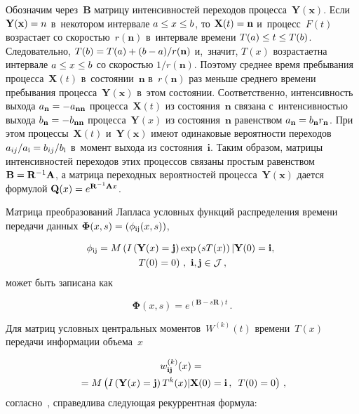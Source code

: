 \begin{multicols}{2}
  Обозначим через~$\mathbf{B}$ матрицу интенсивностей переходов 
процесса~$\mathbf{Y}(\mathbf{x})$. Если $\mathbf{Y}(\mathbf{x})\hm={n}$ 
в~некотором интервале $a\hm\leq x\hm\leq b$, то $\mathbf{X}(t)\hm=\mathbf{n}$ и~процесс~$F(t)$ возрастает со скоростью~$r(\mathbf{n})$ в~интервале времени 
$T(a)\hm\leq t\hm\leq T(b)$. Следовательно, $T(b)\hm= T(a)+(b-a)/r(\mathbf{n})$ 
и,~значит, $T(x)$ возрастает\linebreak на интервале $a\hm\leq x\hm\leq b$ со скоростью 
$1/r(\mathbf{n})$. Поэтому среднее время пребывания процесса~$\mathbf{X}(t)$ 
в~состоянии~$\mathbf{n}$ в~$r(\mathbf{n})$ раз меньше среднего времени 
пребывания процесса~$\mathbf{Y}(\mathbf{x})$ в~этом состоянии. 
Соответственно, интенсивность выхода $a_{\mathbf{n}}\hm= -a_{\mathbf{nn}}$ 
процесса~$\mathbf{X}(t)$ из состояния~$\mathbf{n}$ связана с~интенсивностью 
выхода $b_{\mathbf{n}}\hm= -b_{\mathbf{nn}}$ процесса~$\mathbf{Y}(x)$ из 
состояния~$\mathbf{n}$ равенством $a_{\mathbf{n}}\hm= b_{\mathbf{n}} 
r_{\mathbf{n}}$. При этом процессы~$\mathbf{X}(t)$ 
и~$\mathbf{Y}(\mathbf{x})$ имеют одинаковые вероятности 
переходов~$a_{ij}/a_{\mathrm{i}}\hm= b_{ij}/b_{\mathrm{i}}$ в~момент выхода из 
состояния~$\mathbf{i}$. Таким образом, матрицы интенсивностей переходов этих 
процессов связаны простым равенством $\mathbf{B}\hm=  
\mathbf{R}^{-1}\mathbf{A}$, а матрица переходных вероятностей 
процесса~$\mathbf{Y}(\mathbf{x})$ дается формулой $\mathbf{Q}(x)\hm= 
e^{\mathbf{R}^{-1}\mathbf{A}x}$.
  
  Матрица преобразований Лапласа условных функций распределения времени 
передачи данных $\boldsymbol{\Phi}(x,s)\hm= \left( 
\phi_{\mathrm{ij}}(x,s)\right)$,

\noindent
  \begin{multline*}
  \phi_{\mathrm{ij}}=M\left( 
  I\left( \mathbf{Y}(x)=\mathbf{j}\right) \exp \left( sT(x)\right)\vert 
\mathbf{Y} (0)=\mathbf{i},\right.\\
\left. T(0)=0\right)\,,\ \mathbf{i},\mathbf{j}\in {\cal {J}}\,,
  \end{multline*}
может быть записана как

\noindent
\begin{equation*}
\boldsymbol{\Phi}(x,s)=e^{(\mathbf{B}-s\mathbf{R})t}\,.
\end{equation*}
  
  Для матриц условных центральных моментов~$W^{(k)}(t)$ времени~$T(x)$ 
передачи информации объема~$x$

\noindent
  \begin{multline*}
  w_{\mathbf{ij}}^{(k)}(x)={}\\
  {}=M\left( I\left(\mathbf{Y}(x)=\mathbf{j}\right) T^k(x)\vert 
\mathbf{X}(0)=\mathbf{i}\,,\enskip T(0)=0\right)\,,
  \end{multline*}
согласно~\cite{6-na}, справедлива следующая рекуррентная формула:


\end{multicols}
